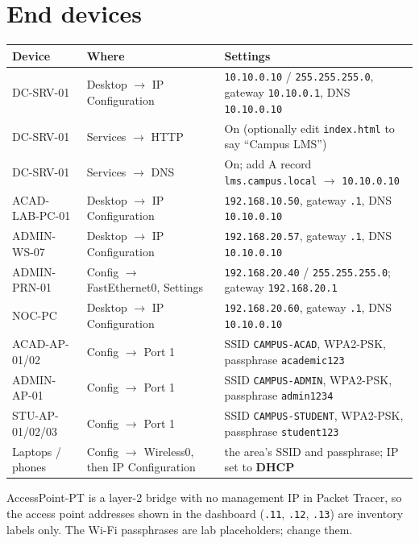 \documentclass[11pt,a4paper]{article}
\newcommand{\code}[1]{\texttt{#1}}
\begin{document}
\section{End devices}

\begin{center}
\small
\begin{tabularx}{\linewidth}{@{}l >{\raggedright\arraybackslash}p{4.2cm} Y@{}}
\toprule
\textbf{Device} & \textbf{Where} & \textbf{Settings} \\
\midrule
DC-SRV-01 & Desktop $\rightarrow$ IP Configuration & \code{10.10.0.10} / \code{255.255.255.0}, gateway \code{10.10.0.1}, DNS \code{10.10.0.10} \\
DC-SRV-01 & Services $\rightarrow$ HTTP & On (optionally edit \code{index.html} to say ``Campus LMS'') \\
DC-SRV-01 & Services $\rightarrow$ DNS & On; add A record \code{lms.campus.local} $\rightarrow$ \code{10.10.0.10} \\
ACAD-LAB-PC-01 & Desktop $\rightarrow$ IP Configuration & \code{192.168.10.50}, gateway \code{.1}, DNS \code{10.10.0.10} \\
ADMIN-WS-07 & Desktop $\rightarrow$ IP Configuration & \code{192.168.20.57}, gateway \code{.1}, DNS \code{10.10.0.10} \\
ADMIN-PRN-01 & Config $\rightarrow$ FastEthernet0, Settings & \code{192.168.20.40} / \code{255.255.255.0}; gateway \code{192.168.20.1} \\
NOC-PC & Desktop $\rightarrow$ IP Configuration & \code{192.168.20.60}, gateway \code{.1}, DNS \code{10.10.0.10} \\
ACAD-AP-01/02 & Config $\rightarrow$ Port 1 & SSID \code{CAMPUS-ACAD}, WPA2-PSK, passphrase \code{academic123} \\
ADMIN-AP-01 & Config $\rightarrow$ Port 1 & SSID \code{CAMPUS-ADMIN}, WPA2-PSK, passphrase \code{admin1234} \\
STU-AP-01/02/03 & Config $\rightarrow$ Port 1 & SSID \code{CAMPUS-STUDENT}, WPA2-PSK, passphrase \code{student123} \\
Laptops / phones & Config $\rightarrow$ Wireless0, then IP Configuration & the area's SSID and passphrase; IP set to \textbf{DHCP} \\
\bottomrule
\end{tabularx}
\end{center}

\begin{note}
AccessPoint-PT is a layer-2 bridge with no management IP in Packet Tracer, so the access point addresses shown in the
dashboard (\code{.11}, \code{.12}, \code{.13}) are inventory labels only. The Wi-Fi passphrases are lab placeholders; change them.
\end{note}
\end{document}
